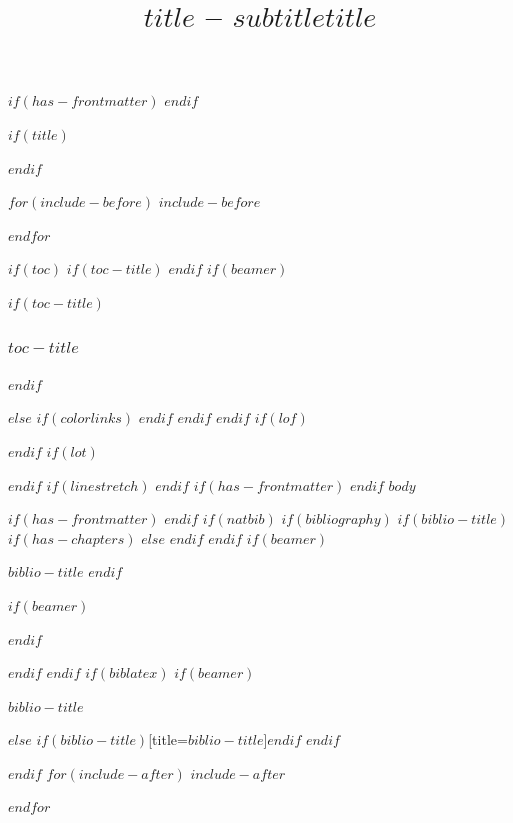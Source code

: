 \documentclass[gmd, manuscript]{copernicus}
\title{$title$ -- $subtitle$}
\title{$title$}
\affil[$affiliation.key$]{$affiliation.value$}
\begin{document}
$if(has-frontmatter)$
\frontmatter
$endif$

$if(title)$
\maketitle
$endif$

$for(include-before)$
$include-before$

$endfor$

$if(toc)$
$if(toc-title)$
\renewcommand*\contentsname{$toc-title$}
$endif$
$if(beamer)$
\begin{frame}[allowframebreaks]
$if(toc-title)$
  \frametitle{$toc-title$}
$endif$
  \tableofcontents[hideallsubsections]
\end{frame}
$else$
{
$if(colorlinks)$
\hypersetup{linkcolor=$if(toccolor)$$toccolor$$else$$endif$}
$endif$
\setcounter{tocdepth}{$toc-depth$}
\tableofcontents
}
$endif$
$endif$
$if(lof)$
\listoffigures
$endif$
$if(lot)$
\listoftables
$endif$
$if(linestretch)$
$endif$
$if(has-frontmatter)$
\mainmatter
$endif$
$body$

\noappendix

$if(has-frontmatter)$
\backmatter
$endif$
$if(natbib)$
$if(bibliography)$
$if(biblio-title)$
$if(has-chapters)$
\renewcommand\bibname{$biblio-title$}
$else$
\renewcommand\refname{$biblio-title$}
$endif$
$endif$
$if(beamer)$
\begin{frame}[allowframebreaks]{$biblio-title$}
  \bibliographytrue
$endif$
  
$if(beamer)$
\end{frame}
$endif$

$endif$
$endif$
$if(biblatex)$
$if(beamer)$
\begin{frame}[allowframebreaks]{$biblio-title$}
  \bibliographytrue
  \printbibliography[heading=none]
\end{frame}
$else$
\printbibliography$if(biblio-title)$[title=$biblio-title$]$endif$
$endif$

$endif$
$for(include-after)$
$include-after$

$endfor$
\end{document}
